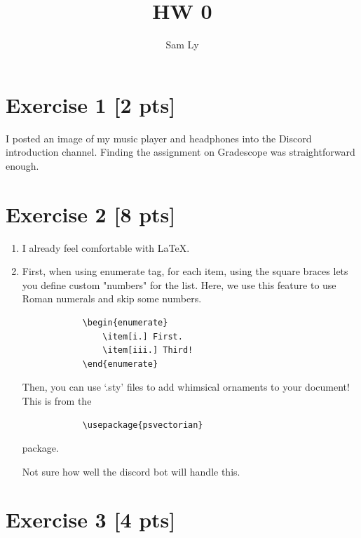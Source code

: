 \documentclass{article}
\title{HW 0}
\author{Sam Ly}
\begin{document}
\maketitle

\section*{Exercise 1 [2 pts]}

I posted an image of my music player and headphones into the 
Discord introduction channel. Finding the assignment on Gradescope
was straightforward enough.

\pagebreak

\section*{Exercise 2 [8 pts]}

\begin{enumerate}
    \item[i.] {
        I already feel comfortable with \LaTeX.
    }
    \item[iv.] {
        First, when using enumerate tag, for each item, using the 
        square braces lets you define custom "numbers" for the list. Here,
        we use this feature to use Roman numerals and skip some numbers.
        \begin{verbatim}
            \begin{enumerate}
                \item[i.] First.
                \item[iii.] Third!
            \end{enumerate}
        \end{verbatim}

        Then, you can use `.sty' files to add whimsical ornaments to your
        document! This is from the \begin{verbatim}
            \usepackage{psvectorian}
        \end{verbatim}
        package.


        Not sure how well the discord bot will handle this.
    }
\end{enumerate}

\section*{Exercise 3 [4 pts]}
\end{document}
